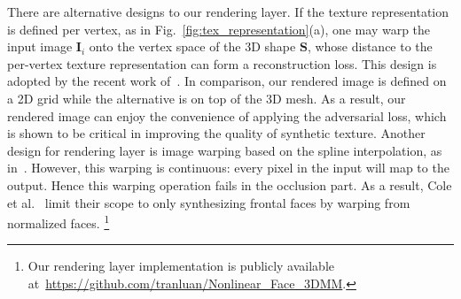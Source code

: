 There are alternative designs to our rendering layer. 
If the texture representation is defined per vertex, as in Fig.~\ref{fig:tex_representation}(a), one may warp the input image $\mathbf{I}_i$ onto the vertex space of the 3D shape $\mathbf{S}$, whose distance to the per-vertex texture representation can form a reconstruction loss. 
This design is adopted by the recent work of~\cite{tewari2017mofa}.
In comparison, our rendered image is defined on a 2D grid while the alternative is on top of the 3D mesh.
As a result, our rendered image can enjoy the convenience of applying the adversarial loss, which is shown to be critical in improving the quality of synthetic texture.
%
Another design for rendering layer is image warping based on the spline interpolation, as in~\cite{cole2017face}. 
However, this warping is continuous: every pixel in the input will map to the output. 
Hence this warping operation fails in the occlusion part. 
As a result, Cole et al.~\cite{cole2017face} limit their scope to only synthesizing frontal faces by warping from normalized faces. \footnote{Our rendering layer implementation is publicly available at~\url{https://github.com/tranluan/Nonlinear_Face_3DMM}.}

